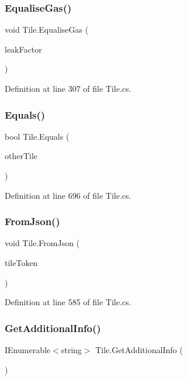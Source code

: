 \subsubsection{\texorpdfstring{Equalise\+Gas()}{EqualiseGas()}}
{\footnotesize\ttfamily void Tile.\+Equalise\+Gas (\begin{DoxyParamCaption}\item[{float}]{leak\+Factor }\end{DoxyParamCaption})}



Definition at line 307 of file Tile.\+cs.

\mbox{\label{class_tile_a96cd7d02df2c613bc99961e1456f4c53}} 
\subsubsection{\texorpdfstring{Equals()}{Equals()}}
{\footnotesize\ttfamily bool Tile.\+Equals (\begin{DoxyParamCaption}\item[{\hyperlink{class_tile}{Tile}}]{other\+Tile }\end{DoxyParamCaption})}



Definition at line 696 of file Tile.\+cs.

\mbox{\label{class_tile_a2c8ea5b7ad194989644872ffbf29c491}} 
\subsubsection{\texorpdfstring{From\+Json()}{FromJson()}}
{\footnotesize\ttfamily void Tile.\+From\+Json (\begin{DoxyParamCaption}\item[{J\+Token}]{tile\+Token }\end{DoxyParamCaption})}



Definition at line 585 of file Tile.\+cs.

\mbox{\label{class_tile_adae7d6b9e3e0e33ed9a398efca024055}} 
\subsubsection{\texorpdfstring{Get\+Additional\+Info()}{GetAdditionalInfo()}}
{\footnotesize\ttfamily I\+Enumerable$<$string$>$ Tile.\+Get\+Additional\+Info (\begin{DoxyParamCaption}{ }\end{DoxyParamCaption})}



